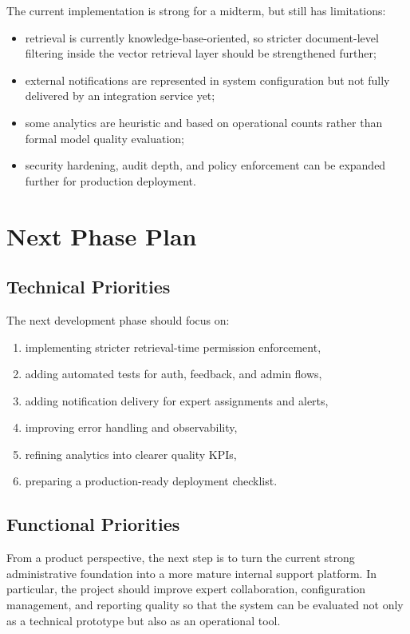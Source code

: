 \documentclass[12pt,a4paper]{report}
\begin{document}
The current implementation is strong for a midterm, but still has limitations:
\begin{itemize}[leftmargin=1.5em]
\item retrieval is currently knowledge-base-oriented, so stricter document-level filtering inside the vector retrieval layer should be strengthened further;
\item external notifications are represented in system configuration but not fully delivered by an integration service yet;
\item some analytics are heuristic and based on operational counts rather than formal model quality evaluation;
\item security hardening, audit depth, and policy enforcement can be expanded further for production deployment.
\end{itemize}

\chapter{Next Phase Plan}

\section{Technical Priorities}

The next development phase should focus on:
\begin{enumerate}[leftmargin=1.5em]
\item implementing stricter retrieval-time permission enforcement,
\item adding automated tests for auth, feedback, and admin flows,
\item adding notification delivery for expert assignments and alerts,
\item improving error handling and observability,
\item refining analytics into clearer quality KPIs,
\item preparing a production-ready deployment checklist.
\end{enumerate}

\section{Functional Priorities}

From a product perspective, the next step is to turn the current strong administrative foundation into a more mature internal support platform. In particular, the project should improve expert collaboration, configuration management, and reporting quality so that the system can be evaluated not only as a technical prototype but also as an operational tool.
\end{document}
